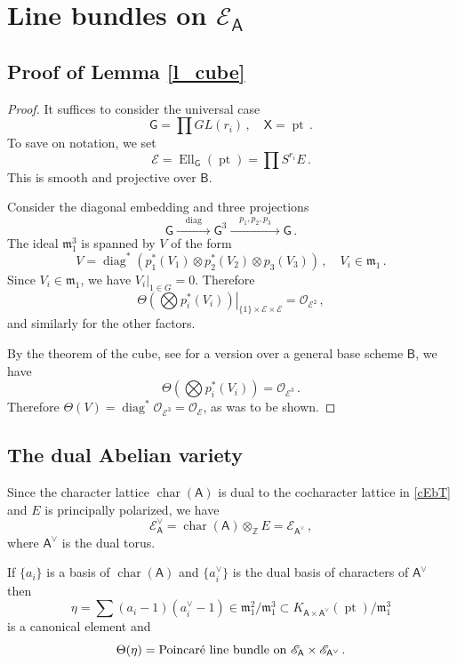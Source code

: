 \documentclass[14pt]{extarticle}
\newcommand{\Z}{\mathbb{Z}}
\newcommand{\bA}{\mathsf{A}}
\newcommand{\bG}{\mathsf{G}}
\newcommand{\bB}{\mathsf{B}}
\newcommand{\bX}{\mathsf{X}}
\newcommand{\cE}{\mathscr{E}}
\newcommand{\cO}{\mathscr{O}}
\newcommand{\fmo}{\mathfrak{m}_1}
\DeclareMathOperator{\Ell}{Ell}
\DeclareMathOperator{\pt}{pt}
\DeclareMathOperator{\cha}{char}
\DeclareMathOperator{\diag}{diag}
\theoremstyle{definition}
\begin{document}
\section{Line bundles on $\cE_\bA$}

\subsection{Proof of Lemma \ref{l_cube}} \label{s_A1}

\begin{proof}
  It suffices to consider the universal case
  $$
  \bG = \prod GL(r_i)\,, \quad  \bX=\pt \,. 
  $$
  To save on notation, we set
  $$
  \cE = \Ell_\bG(\pt) = \prod S^{r_i} E \,. 
  $$
  This is smooth and projective over $\bB$. 
  
  Consider the diagonal embedding and three projections 
  $$
  \bG \xrightarrow{\quad\diag\quad}  \bG^3
  \xrightarrow{\quad p_1,p_2,p_3\quad}   \bG \,. 
$$
The ideal $\fmo^3$ is spanned by $V$ of the form
$$
V = \diag^* \left( p_1^*(V_1) \otimes  p_2^*(V_2) \otimes p_3(V_3)
\right) \,, \quad V_i \in \fmo \,. 
$$
Since $V_i \in \fmo$, we have $V_i\big|_{1\in G} =0$.  Therefore
$$
\left. \Theta\left(\bigotimes  p_i^*(V_i)  \right)\right|_{\{1\} \times
  \cE
  \times \cE} = \cO_{\cE^2}  \,, 
$$
and similarly for the other factors.  


By the theorem of the cube, see \cite{stacks} for a version over a general
base scheme $\bB$, we have
$$
\Theta\left(\bigotimes  p_i^*(V_i)  \right) = \cO_{\cE^3} \,.
$$
Therefore $\Theta(V) = \diag^* \cO_{\cE^3} = \cO_\cE$, as was to be
shown.
\end{proof}

\subsection{The dual Abelian variety} 

Since the character lattice $\cha(\bA)$ is dual to the
cocharacter lattice in \eqref{cEbT} and $E$ is principally polarized,
we have 
$$
\cE^\vee_\bA = \cha(\bA) \otimes_\Z E  = \cE_{\bA^\vee}\,,
$$
where $\bA^\vee$ is the dual torus.

If $\{a_i\}$ is a basis of $\cha(\bA)$ and $\{a^\vee_i\}$ is the dual
  basis of characters of $\bA^\vee$ then
  $$
  \eta = \sum (a_i-1)(a^\vee_i-1)  \in \fmo^2/\fmo^3 \subset K_{\bA \times
    \bA^\vee}(\pt)/\fmo^3 
  $$
  is a canonical element and
  $$
  \Theta(\eta) = \textup{Poincar\'e line bundle on $\cE_{\bA} \times
      \cE_{\bA^\vee}$}
  \,.
  $$
\end{document}
